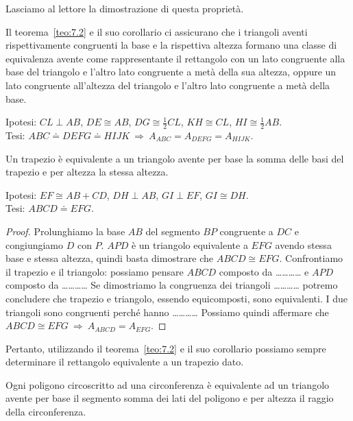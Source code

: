 Lasciamo al lettore la dimostrazione di questa proprietà.

Il teorema~\ref{teo:7.2} e il suo corollario ci assicurano che i triangoli aventi rispettivamente congruenti la base e la rispettiva altezza formano una classe di equivalenza avente come rappresentante il rettangolo con un lato congruente alla base del triangolo e l'altro lato congruente a metà della sua altezza, oppure un lato congruente all'altezza del triangolo e l'altro lato congruente a metà della base. 

\noindent Ipotesi: $CL\perp AB$, $DE\cong AB$, $DG\cong \frac{1}{2}CL$, $KH\cong CL$, $HI\cong\frac{1}{2}AB$.\\
Tesi: $ABC\doteq DEFG\doteq HIJK \:\Rightarrow\: A_{ABC}=A_{DEFG}=A_{HIJK}$.


\begin{teorema}\label{teo:7.3}
Un trapezio è equivalente a un triangolo avente per base la somma delle basi del trapezio e per altezza la stessa altezza.
\end{teorema}

\noindent Ipotesi: $EF\cong AB+CD$, $DH\perp AB$, $GI\perp EF$, $GI\cong DH$.\\
Tesi: $ABCD\doteq EFG$.

\begin{proof}
Prolunghiamo la base $AB$ del segmento $BP$ congruente a $DC$ e congiungiamo $D$ con $P$.
$APD$ è un triangolo equivalente a $EFG$ avendo stessa base e stessa altezza, quindi basta dimostrare che $ABCD\cong EFG$.
Confrontiamo il trapezio e il triangolo: possiamo pensare 
$ABCD$ composto da \ldots\ldots\ldots\ldots{} 
e $APD$ composto da \ldots\ldots\ldots\ldots{}
Se dimostriamo la congruenza dei triangoli \ldots\ldots\ldots\ldots{}
potremo concludere che trapezio e triangolo, essendo equicomposti, sono equivalenti. 
I due triangoli sono congruenti perché hanno \ldots\ldots\ldots\ldots{} 
Possiamo quindi affermare che $ABCD\cong EFG \:\Rightarrow\: A_{ABCD}=A_{EFG}$.
\end{proof}

Pertanto, utilizzando il teorema~\ref{teo:7.2} e il suo corollario possiamo sempre determinare il rettangolo equivalente a un trapezio dato.

\begin{teorema}\label{teo:7.4}
Ogni poligono circoscritto ad una circonferenza è equivalente ad un triangolo avente per base il segmento somma dei lati del poligono e per altezza il raggio della circonferenza.
\end{teorema}

